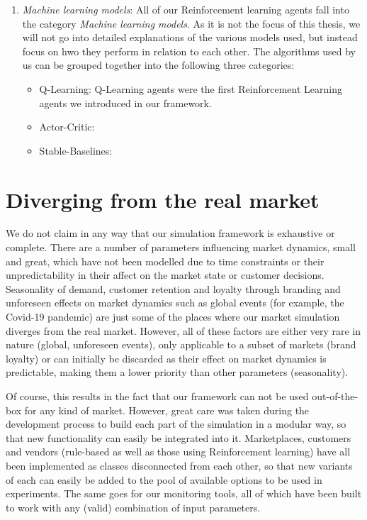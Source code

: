 \begin{enumerate}
	\item \emph{Machine learning models}: All of our Reinforcement learning agents fall into the category \emph{Machine learning models}. As it is not the focus of this thesis, we will not go into detailed explanations of the various models used, but instead focus on hwo they perform in relation to each other. The algorithms used by us can be grouped together into the following three categories:
	      \begin{itemize}
		      \item Q-Learning: Q-Learning agents were the first Reinforcement Learning agents we introduced in our framework.
		      \item Actor-Critic:
		      \item Stable-Baselines:
	      \end{itemize}
\end{enumerate}


\section{Diverging from the real market}

We do not claim in any way that our simulation framework is exhaustive or complete. There are a number of parameters influencing market dynamics, small and great, which have not been modelled due to time constraints or their unpredictability in their affect on the market state or customer decisions. Seasonality of demand, customer retention and loyalty through branding and unforeseen effects on market dynamics such as global events (for example, the Covid-19 pandemic) are just some of the places where our market simulation diverges from the real market. However, all of these factors are either very rare in nature (global, unforeseen events), only applicable to a subset of markets (brand loyalty) or can initially be discarded as their effect on market dynamics is predictable, making them a lower priority than other parameters (seasonality).

Of course, this results in the fact that our framework can not be used out-of-the-box for any kind of market. However, great care was taken during the development process to build each part of the simulation in a modular way, so that new functionality can easily be integrated into it. Marketplaces, customers and vendors (rule-based as well as those using Reinforcement learning) have all been implemented as classes disconnected from each other, so that new variants of each can easily be added to the pool of available options to be used in experiments. The same goes for our monitoring tools, all of which have been built to work with any (valid) combination of input parameters.
